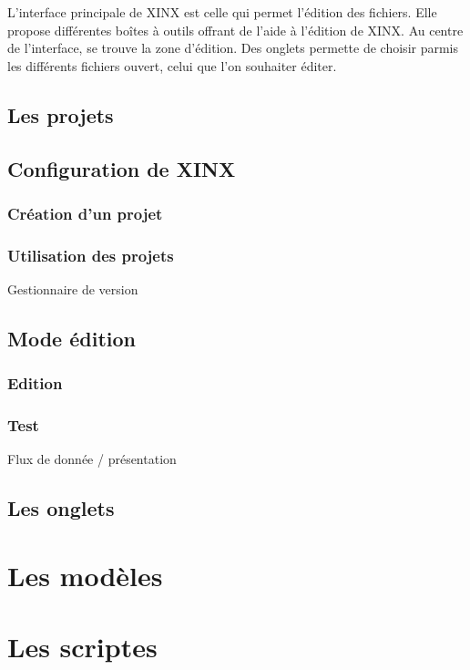 \documentclass[a4paper,10pt,twoside]{book}
\begin{document}
L'interface principale de XINX est celle qui permet l'édition des fichiers. Elle propose différentes boîtes à outils offrant de l'aide à l'édition de XINX. Au centre de l'interface, se trouve la zone d'édition. Des onglets permette de choisir parmis les différents fichiers ouvert, celui que l'on souhaiter éditer.



\section{Les projets}

\section{Configuration de XINX}

\subsection{Création d'un projet}

\subsection{Utilisation des projets}
\label{sec:RCS}
Gestionnaire de version

\section{Mode édition}

\subsection{Edition}

\subsection{Test}

Flux de donnée / présentation

\section{Les onglets}

\chapter{Les modèles}

\chapter{Les scriptes}
\label{sec:Scripts}
\end{document}
